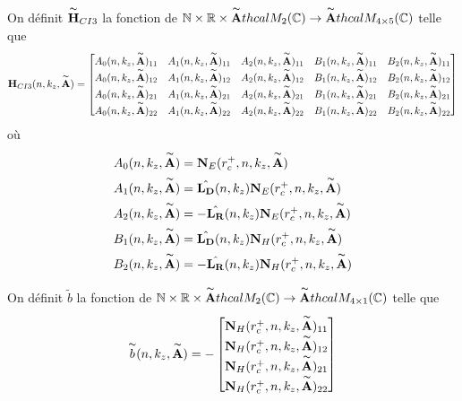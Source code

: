     \begin{defn}
      On définit \(\overset{\thicksim}{\mathbf{H}}_{CI3}\) la fonction de \(\mathbb N \times \mathbb R \times \overset{\thicksim}{\mathbf{A}}thcal{M}_2(\mathbb C) \rightarrow \overset{\thicksim}{\mathbf{A}}thcal{M}_{4\times5}(\mathbb C)\) telle que
      \begin{equation*}
        \mathbf{H}_{CI3}(n,k_z,\overset{\thicksim}{\mathbf{A}}) = 
        \begin{bmatrix}
          A_0(n,k_z,\overset{\thicksim}{\mathbf{A}})_{11} & A_1(n,k_z,\overset{\thicksim}{\mathbf{A}})_{11} & A_2(n,k_z,\overset{\thicksim}{\mathbf{A}})_{11} & B_1(n,k_z,\overset{\thicksim}{\mathbf{A}})_{11} & B_2(n,k_z,\overset{\thicksim}{\mathbf{A}})_{11}
          \\
          A_0(n,k_z,\overset{\thicksim}{\mathbf{A}})_{12} & A_1(n,k_z,\overset{\thicksim}{\mathbf{A}})_{12} & A_2(n,k_z,\overset{\thicksim}{\mathbf{A}})_{12} & B_1(n,k_z,\overset{\thicksim}{\mathbf{A}})_{12} & B_2(n,k_z,\overset{\thicksim}{\mathbf{A}})_{12}
          \\
          A_0(n,k_z,\overset{\thicksim}{\mathbf{A}})_{21} & A_1(n,k_z,\overset{\thicksim}{\mathbf{A}})_{21} & A_2(n,k_z,\overset{\thicksim}{\mathbf{A}})_{21} & B_1(n,k_z,\overset{\thicksim}{\mathbf{A}})_{21} & B_2(n,k_z,\overset{\thicksim}{\mathbf{A}})_{21}
          \\
          A_0(n,k_z,\overset{\thicksim}{\mathbf{A}})_{22} & A_1(n,k_z,\overset{\thicksim}{\mathbf{A}})_{22} & A_2(n,k_z,\overset{\thicksim}{\mathbf{A}})_{22} & B_1(n,k_z,\overset{\thicksim}{\mathbf{A}})_{22} & B_2(n,k_z,\overset{\thicksim}{\mathbf{A}})_{22}
        \end{bmatrix}
        \end{equation*}
        où
        \begin{align*}
          A_0(n,k_z,\overset{\thicksim}{\mathbf{A}}) &= \mathbf{N}_E(r_c^+,n,k_z,\overset{\thicksim}{\mathbf{A}})
          \\
          A_1(n,k_z,\overset{\thicksim}{\mathbf{A}}) &= \hat{\mathbf{L_D}}(n,k_z)\mathbf{N}_E(r_c^+,n,k_z,\overset{\thicksim}{\mathbf{A}})
          \\
          A_2(n,k_z,\overset{\thicksim}{\mathbf{A}}) &= -\hat{\mathbf{L_R}}(n,k_z)\mathbf{N}_E(r_c^+,n,k_z,\overset{\thicksim}{\mathbf{A}})
          \\
          B_1(n,k_z,\overset{\thicksim}{\mathbf{A}}) &= \hat{\mathbf{L_D}}(n,k_z)\mathbf{N}_H(r_c^+,n,k_z,\overset{\thicksim}{\mathbf{A}})
          \\
          B_2(n,k_z,\overset{\thicksim}{\mathbf{A}}) &= -\hat{\mathbf{L_R}}(n,k_z)\mathbf{N}_H(r_c^+,n,k_z,\overset{\thicksim}{\mathbf{A}})            
        \end{align*}

        On définit \(\tilde{b}\) la fonction de \(\mathbb N \times \mathbb R \times \overset{\thicksim}{\mathbf{A}}thcal{M}_2(\mathbb C) \rightarrow \overset{\thicksim}{\mathbf{A}}thcal{M}_{4\times1}(\mathbb C)\) telle que
        \begin{equation*}
          \overset{\thicksim}{b}(n,k_z,\overset{\thicksim}{\mathbf{A}}) = -
          \begin{bmatrix}
            \mathbf{N}_H(r_c^+,n,k_z,\overset{\thicksim}{\mathbf{A}})_{11}
            \\
            \mathbf{N}_H(r_c^+,n,k_z,\overset{\thicksim}{\mathbf{A}})_{12}
            \\
            \mathbf{N}_H(r_c^+,n,k_z,\overset{\thicksim}{\mathbf{A}})_{21}
            \\
            \mathbf{N}_H(r_c^+,n,k_z,\overset{\thicksim}{\mathbf{A}})_{22}
          \end{bmatrix}
        \end{equation*}
      \end{defn}

